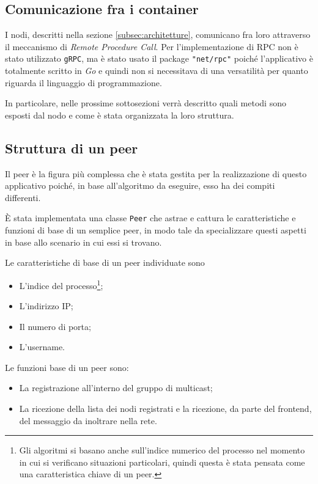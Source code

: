 \documentclass[acmtog]{acmart}
\begin{document}
\subsection{Comunicazione fra i container}
I nodi, descritti nella sezione \ref{subsec:architetture}, comunicano fra loro attraverso il meccanismo di \textit{Remote Procedure Call}. Per l'implementazione di RPC non è stato utilizzato \texttt{gRPC}, ma è stato usato il package \texttt{"net/rpc"} poiché l'applicativo è totalmente scritto in \textit{Go} e quindi non si necessitava di una versatilità per quanto riguarda il linguaggio di programmazione.

In particolare, nelle prossime sottosezioni verrà descritto quali metodi sono esposti dal nodo e come è stata organizzata la loro struttura.

\subsection{Struttura di un peer}
Il peer è la figura più complessa che è stata gestita per la realizzazione di questo applicativo poiché, in base all'algoritmo da eseguire, esso ha dei compiti differenti.

È stata implementata una classe \texttt{Peer} che astrae e cattura le caratteristiche e funzioni di base di un semplice peer, in modo tale da specializzare questi aspetti in base allo scenario in cui essi si trovano.

Le caratteristiche di base di un peer individuate sono
\begin{itemize}
\item L'indice del processo\footnote{Gli algoritmi si basano anche sull'indice numerico del processo nel momento in cui si verificano situazioni particolari, quindi questa è stata pensata come una caratteristica chiave di un peer.};
\item L'indirizzo IP;
\item Il numero di porta;
\item L'username.
\end{itemize}

Le funzioni base di un peer sono:
\begin{itemize}
\item La registrazione all'interno del gruppo di multicast;
\item La ricezione della lista dei nodi registrati e la ricezione, da parte del frontend, del messaggio da inoltrare nella rete.
\end{itemize}
\end{document}
